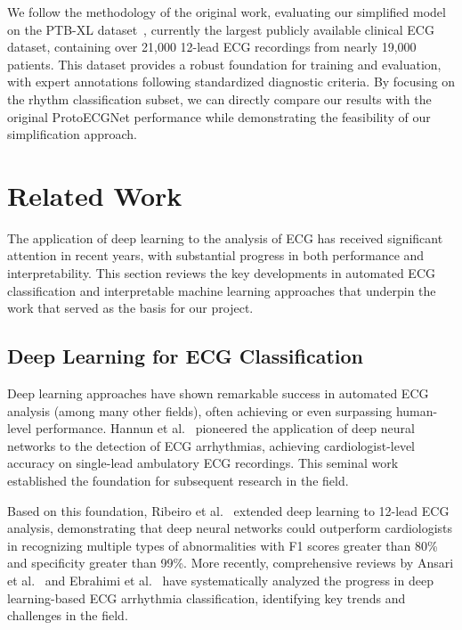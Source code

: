 We follow the methodology of the original work, evaluating our simplified model on the PTB-XL dataset~\cite{wagner2020ptbxl}, currently the largest publicly available clinical ECG dataset, containing over 21,000 12-lead ECG recordings from nearly 19,000 patients. This dataset provides a robust foundation for training and evaluation, with expert annotations following standardized diagnostic criteria. By focusing on the rhythm classification subset, we can directly compare our results with the original ProtoECGNet performance while demonstrating the feasibility of our simplification approach.

\section{Related Work}

The application of deep learning to the analysis of ECG has received significant attention in recent years, with substantial progress in both performance and interpretability. This section reviews the key developments in automated ECG classification and interpretable machine learning approaches that underpin the work that served as the basis for our project.

\subsection{Deep Learning for ECG Classification}

Deep learning approaches have shown remarkable success in automated ECG analysis (among many other fields), often achieving or even surpassing human-level performance. Hannun et al.~\cite{hannun2019cardiologist} pioneered the application of deep neural networks to the detection of ECG arrhythmias, achieving cardiologist-level accuracy on single-lead ambulatory ECG recordings. This seminal work established the foundation for subsequent research in the field.

Based on this foundation, Ribeiro et al.~\cite{ribeiro2020automatic} extended deep learning to 12-lead ECG analysis, demonstrating that deep neural networks could outperform cardiologists in recognizing multiple types of abnormalities with F1 scores greater than 80\% and specificity greater than 99\%. More recently, comprehensive reviews by Ansari et al.~\cite{ansari2023deep} and Ebrahimi et al.~\cite{ebrahimi2020deep} have systematically analyzed the progress in deep learning-based ECG arrhythmia classification, identifying key trends and challenges in the field.

